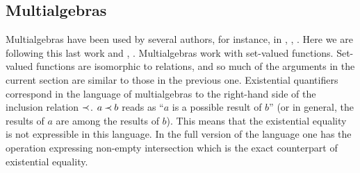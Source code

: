 \subsection{Multialgebras}
Multialgebras have been used by several authors, for instance, in \cite{PS1}, \cite{HusB}, \cite{adt}. Here we are following this last work and \cite{Mich},
\cite{taps}.
Multialgebras work with set-valued functions. 
Set-valued functions are isomorphic to relations, and so much of the arguments in the 
current section are similar to those in the previous one.
Existential quantifiers correspond in the language of multialgebras to the right-hand side of the inclusion relation $\mathbin{\prec}$. $a\mathbin{\prec} b$ reads as ``$a$ is a possible result of $b$'' (or in general, the results of $a$ are among the results of $b$).
This means that the existential equality is not expressible in this language. In the full version of the language
\cite{KW} one has the operation expressing non-empty intersection which is the exact counterpart of existential equality. 

